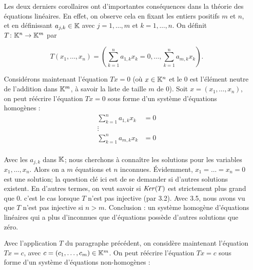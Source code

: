 \documentclass[12pt]{book}
\begin{document}
Les deux derniers corollaires ont d'importantes conséquences dans la théorie des équations linéaires. En effet, on observe cela en fixant les entiers positifs $m$ et $n$, et en définissant $a_{j,k}\in\mathbb{K}$ avec $j=1,\ldots,m$ et $k=1,\ldots,n$. On définit $T\colon \mathbb{K}^n\rightarrow \mathbb{K}^m$ par 

\begin{equation*}
    T(x_1,\ldots,x_n)=(\sum_{k=1}^na_{1,k}x_k=0 ,\ldots,\sum_{k=1}^na_{m,k}x_k).
\end{equation*}

Considérons maintenant l'équation $Tx=0$ (où $x\in\mathbb{K}^n$ et le 0 est l'élément neutre de l'addition dans $\mathbb{K}^m$, à savoir la liste de taille $m$ de 0). Soit $x = (x_1,\ldots,x_n)$, on peut réécrire l'équation $Tx=0$ sous forme d'un système d'équations homogènes :   
\begin{equation*}
    \begin{split}
    \sum_{k=1}^na_{1,k}x_k& =0\\
    \vdots&\\
    \sum_{k=1}^na_{m,k}x_k& =0\\
    \end{split}
\end{equation*}

\noindent
Avec les $a_{j,k}$ dans $\mathbb{K}$; nous cherchons à connaître les solutions pour les variables $x_1,\ldots,x_n$. Alors on a $m$ équations et $n$ inconnues. Évidemment, $x_1=\ldots=x_n=0$ est une solution; la question clé ici est de se demander si d'autres solutions existent. En d'autres termes, on veut savoir si $\textrm{\textit{Ker}}(T)$ est strictement plus grand que ${0}$. c'est le cas lorsque $T$ n'est pas injective (par 3.2). Avec 3.5, nous avons vu que $T$ n'est pas injective si $n>m$. Conclusion : un système homogène d'équations linéaires qui a plus d'inconnues que d'équations possède d'autres solutions que zéro.

Avec l'application $T$ du paragraphe précédent, on considère maintenant l'équation $Tx=c$, avec $c=(c_1,\ldots,c_m)\in\mathbb{K}^m$. On peut réécrire l'équation $Tx=c$ sous forme d'un système d'équations non-homogènes :
\end{document}

